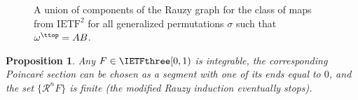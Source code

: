 \documentclass[12pt]{article}
\newtheorem{proposition}{Proposition}
\theoremstyle{definition}
\begin{document}
\begin{figure}


\caption[]{A union of components of the Rauzy graph for the class of maps from $\mathrm{IETF}^2$ for all generalized permutations $\sigma$ such that ${\omega}^{\ttop}=AB$.}\label{fig:IET2}
\end{figure}



\begin{proposition}\label{prop:ietfthree_integrability}
Any $F \in \IETFthree[0,1)$ is integrable, the corresponding Poincaré section can be chosen as a segment with one of its ends equal to $0$, and the set $\{{\mathcal{R}}^n F\}$ is finite (the modified Rauzy induction eventually stops).
\end{proposition}
\end{document}
